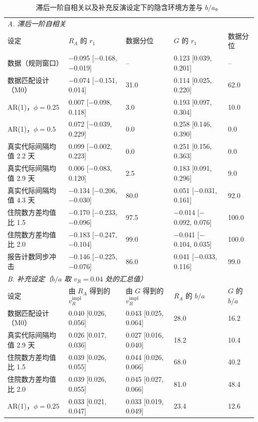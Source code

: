 \begin{table}[htbp]
\centering
\footnotesize
\setlength{\tabcolsep}{4pt}
\caption{滞后一阶自相关以及补充反演设定下的隐含环境方差与 $b/a$。}
\label{tab:s9}
\begin{tabular}{lllll}
\toprule
\multicolumn{5}{l}{\textit{A. 滞后一阶自相关}}\\
设定 & $R_A$ 的 $r_1$ & 数据分位 & $G$ 的 $r_1$ & 数据分位 \\
\midrule
数据（规则窗口） & $-$0.095 [$-$0.168, $-$0.019] & -- & 0.123 [0.039, 0.201] & -- \\
数据匹配设计（M0） & $-$0.074 [$-$0.151, 0.014] & 31.0 & 0.114 [0.025, 0.220] & 62.0 \\
AR(1)，$\phi=0.25$ & 0.007 [$-$0.098, 0.118] & 3.0 & 0.193 [0.097, 0.304] & 10.0 \\
AR(1)，$\phi=0.5$ & 0.072 [$-$0.039, 0.229] & 0.0 & 0.258 [0.146, 0.390] & 0.0 \\
真实代际间隔均值 2.2 天 & 0.099 [$-$0.002, 0.223] & 0.0 & 0.251 [0.156, 0.363] & 0.0 \\
真实代际间隔均值 2.9 天 & 0.006 [$-$0.083, 0.120] & 2.5 & 0.183 [0.091, 0.296] & 9.0 \\
真实代际间隔均值 4.3 天 & $-$0.134 [$-$0.206, $-$0.030] & 80.0 & 0.051 [$-$0.031, 0.161] & 92.0 \\
住院数方差均值比 1.5 & $-$0.170 [$-$0.233, $-$0.096] & 97.5 & $-$0.014 [$-$0.092, 0.076] & 100.0 \\
住院数方差均值比 2.0 & $-$0.183 [$-$0.247, $-$0.104] & 99.0 & $-$0.041 [$-$0.104, 0.035] & 100.0 \\
报告计数同步冲击 & $-$0.146 [$-$0.225, $-$0.076] & 86.0 & 0.041 [$-$0.033, 0.116] & 99.0 \\
\midrule
\multicolumn{5}{l}{\textit{B. 补充设定（$b/a$ 取 $v_R=0.04$ 处的汇总值）}}\\
设定 & 由 $R_A$ 得到的 $v_R^{\mathrm{impl}}$ & 由 $G$ 得到的 $v_R^{\mathrm{impl}}$ & $R_A$ 的 $b/a$ & $G$ 的 $b/a$ \\
\midrule
数据匹配设计（M0） & 0.040 [0.026, 0.056] & 0.043 [0.025, 0.064] & 28.0 & 16.2 \\
真实代际间隔均值 2.9 天 & 0.026 [0.017, 0.036] & 0.027 [0.016, 0.040] & 18.2 & 10.4 \\
住院数方差均值比 1.5 & 0.039 [0.026, 0.055] & 0.044 [0.026, 0.066] & 68.0 & 40.2 \\
住院数方差均值比 2.0 & 0.039 [0.026, 0.055] & 0.045 [0.027, 0.066] & 81.0 & 48.4 \\
AR(1)，$\phi=0.25$ & 0.033 [0.021, 0.047] & 0.033 [0.019, 0.049] & 23.4 & 12.6 \\

\end{tabular}
\end{table}

